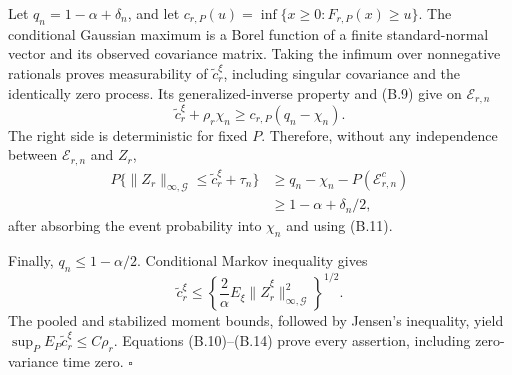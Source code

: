 Let \(q_n=1-\alpha+\delta_n\), and let
\(c_{r,P}(u)=\inf\{x\ge0:F_{r,P}(x)\ge u\}\). The conditional Gaussian maximum is a Borel function of a finite standard-normal vector and its observed covariance matrix. Taking the infimum over nonnegative rationals proves measurability of \(\widetilde c_r^\xi\), including singular covariance and the identically zero process. Its generalized-inverse property and (B.9) give on \(\mathcal E_{r,n}\)
\[
 \widetilde c_r^\xi+\rho_r\chi_n
 \ge c_{r,P}(q_n-\chi_n).                                 \tag{B.12}
\]
The right side is deterministic for fixed \(P\). Therefore, without any independence between \(\mathcal E_{r,n}\) and \(Z_r\),
\[
\begin{aligned}
 P\{\|Z_r\|_{\infty,\mathcal G}\le
 \widetilde c_r^\xi+\tau_n\}
 &\ge q_n-\chi_n-P(\mathcal E_{r,n}^c)\\
 &\ge1-\alpha+\delta_n/2,
\end{aligned}                                             \tag{B.13}
\]
after absorbing the event probability into \(\chi_n\) and using (B.11).

Finally, \(q_n\le1-\alpha/2\). Conditional Markov inequality gives
\[
 \widetilde c_r^\xi\le
 \left\{\frac2\alpha E_\xi
 \|\widehat Z_r^\xi\|_{\infty,\mathcal G}^2\right\}^{1/2}. \tag{B.14}
\]
The pooled and stabilized moment bounds, followed by Jensen's inequality, yield
\(\sup_PE_P\widetilde c_r^\xi\le C\rho_r\). Equations (B.10)--(B.14) prove every assertion, including zero-variance time zero. \(\square\)
